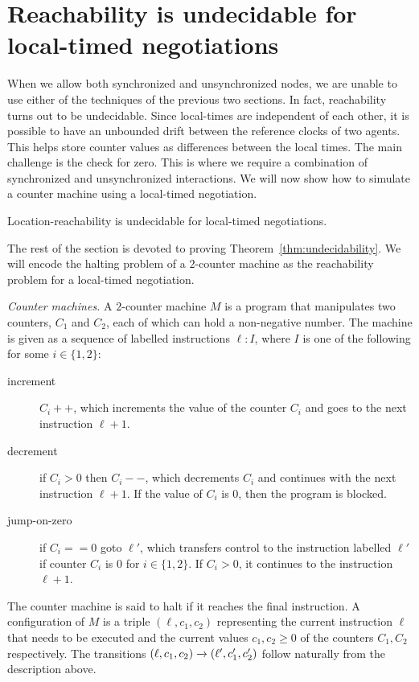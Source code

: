 \section{Reachability is undecidable for local-timed negotiations}

When we allow both synchronized and unsynchronized nodes, we are
unable to use either of the techniques of the previous two
sections. In fact, reachability
turns out to be undecidable. Since local-times are independent of each
other, it is possible to have an unbounded drift between the reference
clocks of two agents. This helps store counter values as differences
between the local times. The main challenge is the check for
zero. This is where we require a combination of synchronized and
unsynchronized interactions. We will now show how to simulate a counter
machine using a local-timed negotiation.

\begin{theorem}\label{thm:undecidability}
  Location-reachability is undecidable for local-timed negotiations.
\end{theorem}

The rest of the section is devoted to proving
Theorem~\ref{thm:undecidability}. We will encode the halting problem
of a $2$-counter machine as the reachability problem for a local-timed
negotiation.


\noindent \emph{Counter machines.} A $2$-counter machine $M$ is a program that manipulates two counters, $C_1$ and $C_2$,
each of which can hold a non-negative number. The machine is given as
a sequence of labelled instructions $\ell:I$, where $I$ is one of the following for some $i \in \{1, 2\}$: 
\begin{description}
\item[increment] $C_i + +$, which increments the value of the
  counter $C_i$ and goes to the next instruction
  $\ell+1$.
\item[decrement] if $C_i>0$ then $C_i- -$, which decrements $C_i$ and continues with the next instruction
  $\ell+1$. If the value of $C_i$ is $0$, then the program is blocked. 
\item[jump-on-zero] if $C_i= = 0$ goto $\ell'$, which transfers control to the instruction labelled $\ell'$ if counter $C_i$ is $0$ for
  $i\in\{1,2\}$. If $C_i>0$, it continues to the instruction $\ell+1$.
\end{description}
The counter machine is said to halt if it reaches the final
instruction. A configuration of $M$ is a triple $(\ell, c_1, c_2)$ representing the current instruction $\ell$ that needs to be executed and the current values $c_1, c_2 \ge 0$ of the counters $C_1, C_2$ respectively. The transitions $(\ell, c_1, c_2) \xrightarrow{} (\ell', c'_1, c'_2)$ follow naturally from the description above.


